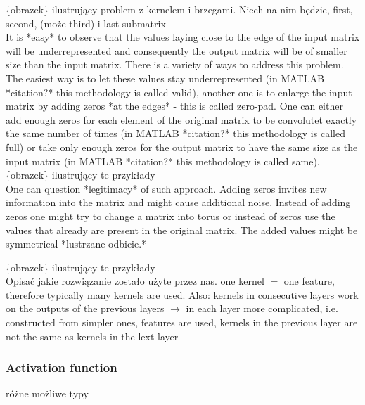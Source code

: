 \documentclass[a4paper,10pt]{report}
\begin{document}
	  \{obrazek\} ilustrujący problem z kernelem i brzegami. Niech na nim będzie, first, second, (może third) i last submatrix\\
	  
	  It is *easy* to observe that the values laying close to the edge of the input matrix will be underrepresented and consequently the output matrix will be of smaller size than the input matrix. There is a variety of ways to address this problem.\\
	  
	  The easiest way is to let these values stay underrepresented (in MATLAB *citation?* this methodology is called valid), another one is to enlarge the input matrix by adding zeros *at the edges* - this is called zero-pad. One can either add enough zeros for each element of the original matrix to be convolutet exactly the same number of times (in MATLAB *citation?* this methodology is called full) or take only enough zeros for the output matrix to have the same size as the input matrix (in MATLAB *citation?* this methodology is called same).\\
	  
	  \{obrazek\} ilustrujący te przykłady \\
	  
	  One can question *legitimacy* of such approach. Adding zeros invites new information into the matrix and might cause additional noise. Instead of adding zeros one might try to change a matrix into torus or instead of zeros use the values that already are present in the original matrix. The added values might be symmetrical *lustrzane odbicie.*
	  
	  \{obrazek\} ilustrujący te przykłady \\
	  
	  
	  Opisać jakie rozwiązanie zostało użyte przez nas. one kernel $=$ one feature, therefore typically many kernels are used. Also: kernels in consecutive layers work on the outputs of the previous layers $\rightarrow$ in each layer more complicated, i.e. constructed from simpler ones, features are used, kernels in the previous layer are not the same as kernels in the lext layer \\
	
	\subsubsection{Activation function} %
	  różne możliwe typy
	
\end{document}

